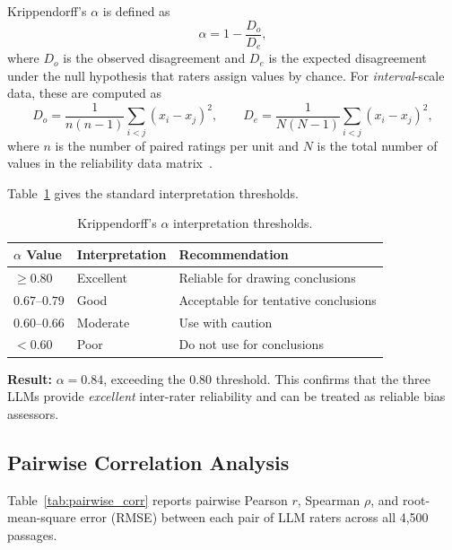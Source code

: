 \documentclass[10pt,letterpaper]{article}
\begin{document}
Krippendorff's $\alpha$ is defined as
\begin{equation}
  \alpha = 1 - \frac{D_o}{D_e},
  \label{eq:kripp_alpha}
\end{equation}
where $D_o$ is the observed disagreement and $D_e$ is the expected disagreement
under the null hypothesis that raters assign values by chance.  For
\emph{interval}-scale data, these are computed as
\begin{equation}
  D_o = \frac{1}{n(n-1)} \sum_{i<j} (x_i - x_j)^2,
  \qquad
  D_e = \frac{1}{N(N-1)} \sum_{i<j} (x_i - x_j)^2,
  \label{eq:kripp_components}
\end{equation}
where $n$ is the number of paired ratings per unit and $N$ is the total number of
values in the reliability data matrix~\citep{krippendorff2018content}.

Table~\ref{tab:alpha_thresholds} gives the standard interpretation thresholds.

\begin{table}[h]
\centering
\caption{Krippendorff's $\alpha$ interpretation thresholds.}
\label{tab:alpha_thresholds}
\begin{tabular}{lll}
\toprule
\textbf{$\alpha$ Value} & \textbf{Interpretation} & \textbf{Recommendation} \\
\midrule
$\geq 0.80$   & Excellent & Reliable for drawing conclusions \\
$0.67$--$0.79$ & Good      & Acceptable for tentative conclusions \\
$0.60$--$0.66$ & Moderate  & Use with caution \\
$< 0.60$      & Poor      & Do not use for conclusions \\
\bottomrule
\end{tabular}
\end{table}

\textbf{Result:} $\alpha = 0.84$, exceeding the $0.80$ threshold.  This confirms
that the three LLMs provide \emph{excellent} inter-rater reliability and can be
treated as reliable bias assessors.

\subsection{Pairwise Correlation Analysis}

Table~\ref{tab:pairwise_corr} reports pairwise Pearson $r$, Spearman $\rho$, and
root-mean-square error (RMSE) between each pair of LLM raters across all 4,500
passages.
\end{document}
